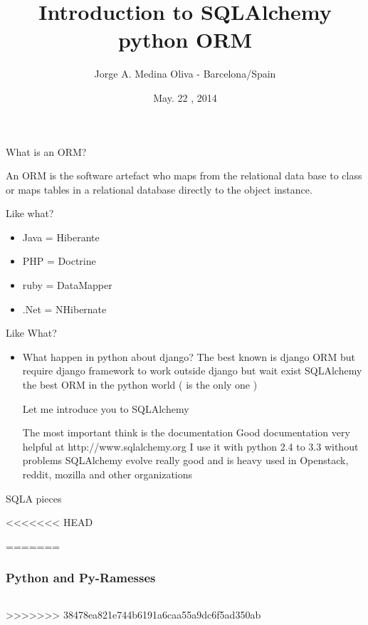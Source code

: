 \documentclass[seagull]{beamer}
\author{Jorge A. Medina Oliva - Barcelona/Spain}
\title{Introduction to SQLAlchemy python ORM}
\date{May. 22 , 2014}
\begin{document}
\begin{frame}
\titlepage
\end{frame}


\begin{frame}{What is an ORM?}

An ORM is the software artefact who maps from the relational data base to class 
or maps tables in a relational database directly to the object instance.

\end{frame}

\begin{frame}{Like what?}
\begin{itemize}
	\item Java = Hiberante
	\item PHP = Doctrine
	\item ruby = DataMapper
	\item .Net = NHibernate
\end{itemize}
\end{frame}

\begin{frame}{Like What?}
\begin{itemize}
	\item What happen in python about django?
The best known is django ORM but require django framework to work outside django
but wait exist SQLAlchemy the best ORM in the python world ( is the only one )

Let me introduce you to SQLAlchemy

The most important think is the documentation
Good documentation very helpful at http://www.sqlalchemy.org
I use it with python 2.4 to  3.3 without problems
SQLAlchemy evolve really good and is heavy used in Openstack, reddit, mozilla and other organizations
\end{itemize}
\end{frame}

\begin{frame}{SQLA pieces}
\centering{}
\end{frame}

\begin{frame}
<<<<<<< HEAD

=======
    \frametitle{Python and Py-Ramesses}
    \inputminted{python}{filename.py}
>>>>>>> 38478ea821e744b6191a6caa55a9dc6f5ad350ab
\end{frame}
\end{document}
